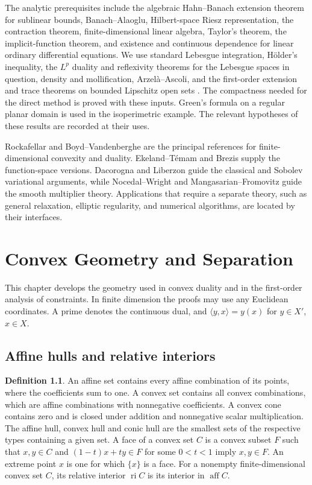 \documentclass[11pt,oneside,openany]{book}
\theoremstyle{plain}
\theoremstyle{definition}
\newtheorem{definition}[theorem]{Definition}
\theoremstyle{remark}
\begin{document}
The analytic prerequisites include the algebraic Hahn--Banach
extension theorem for sublinear bounds, Banach--Alaoglu, Hilbert-space
Riesz representation, the contraction theorem, finite-dimensional
linear algebra, Taylor's theorem, the implicit-function theorem, and
existence and continuous dependence for linear ordinary differential
equations. We use standard Lebesgue integration, H\"older's inequality,
the \(L^p\) duality and reflexivity theorems for the Lebesgue spaces in
question, density and mollification, Arzelà--Ascoli, and the first-order extension and
trace theorems on bounded Lipschitz open sets
\cite[Chapter 9]{Brezis}\cite[Unit U5]{MathGenomeP102}. The compactness
needed for the direct method is proved with these inputs. Green's
formula on a regular planar domain is used in the isoperimetric
example. The relevant hypotheses of these results are recorded at
their uses.

Rockafellar and Boyd--Vandenberghe are the principal references for
finite-dimensional convexity and duality. Ekeland--T\'emam and Brezis
supply the function-space versions. Dacorogna and Liberzon guide the
classical and Sobolev variational arguments, while Nocedal--Wright
and Mangasarian--Fromovitz guide the smooth multiplier theory.
Applications that require a separate theory, such as general
relaxation, elliptic regularity, and numerical algorithms, are located
by their interfaces.

\mainmatter
\chapter{Convex Geometry and Separation}

This chapter develops the geometry used in convex duality and in the
first-order analysis of constraints. In finite dimension the proofs may
use any Euclidean coordinates. A prime denotes the continuous dual, and
\(\langle y,x\rangle=y(x)\) for \(y\in X'\), \(x\in X\).

\section{Affine hulls and relative interiors}\label{v01-01}

\begin{definition}
An affine set contains every affine combination of its points, where
the coefficients sum to one. A convex set contains all convex
combinations, which are affine combinations with nonnegative
coefficients. A convex cone contains zero and is closed under addition
and nonnegative scalar multiplication. The affine hull, convex hull
and conic hull are the smallest sets of the respective types containing
a given set. A face of a convex set \(C\) is a convex subset \(F\)
such that \(x,y\in C\) and \((1-t)x+ty\in F\) for some \(0<t<1\)
imply \(x,y\in F\). An extreme point \(x\) is one for which \(\{x\}\)
is a face. For a nonempty finite-dimensional convex set \(C\), its
relative interior \(\operatorname{ri}C\) is its interior in
\(\operatorname{aff}C\).
\end{definition}
\end{document}

